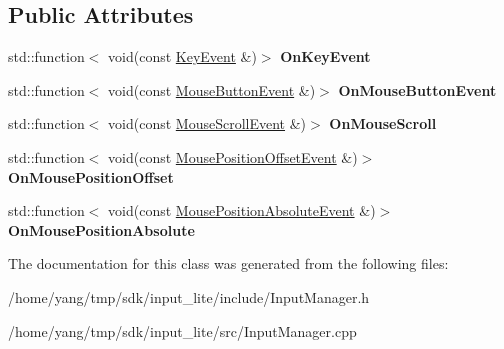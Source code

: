 \subsection*{Public Attributes}
\begin{DoxyCompactItemize}
\item 
std\+::function$<$ void(const \hyperlink{struct_s_l_1_1_input___lite_1_1_key_event}{Key\+Event} \&)$>$ {\bfseries On\+Key\+Event}\hypertarget{class_s_l_1_1_input___lite_1_1_input_manager_abb565d47b0c2be57d949d58ebfb25ad2}{}\label{class_s_l_1_1_input___lite_1_1_input_manager_abb565d47b0c2be57d949d58ebfb25ad2}

\item 
std\+::function$<$ void(const \hyperlink{struct_s_l_1_1_input___lite_1_1_mouse_button_event}{Mouse\+Button\+Event} \&)$>$ {\bfseries On\+Mouse\+Button\+Event}\hypertarget{class_s_l_1_1_input___lite_1_1_input_manager_a9acec2bd9dbb7becba6ffa7d7c4d4134}{}\label{class_s_l_1_1_input___lite_1_1_input_manager_a9acec2bd9dbb7becba6ffa7d7c4d4134}

\item 
std\+::function$<$ void(const \hyperlink{struct_s_l_1_1_input___lite_1_1_mouse_scroll_event}{Mouse\+Scroll\+Event} \&)$>$ {\bfseries On\+Mouse\+Scroll}\hypertarget{class_s_l_1_1_input___lite_1_1_input_manager_ab1094f8733da4d16a447db7de2fb6ae3}{}\label{class_s_l_1_1_input___lite_1_1_input_manager_ab1094f8733da4d16a447db7de2fb6ae3}

\item 
std\+::function$<$ void(const \hyperlink{struct_s_l_1_1_input___lite_1_1_mouse_position_offset_event}{Mouse\+Position\+Offset\+Event} \&)$>$ {\bfseries On\+Mouse\+Position\+Offset}\hypertarget{class_s_l_1_1_input___lite_1_1_input_manager_a00d65c62f147a2c91cf4ec6fa474c64c}{}\label{class_s_l_1_1_input___lite_1_1_input_manager_a00d65c62f147a2c91cf4ec6fa474c64c}

\item 
std\+::function$<$ void(const \hyperlink{struct_s_l_1_1_input___lite_1_1_mouse_position_absolute_event}{Mouse\+Position\+Absolute\+Event} \&)$>$ {\bfseries On\+Mouse\+Position\+Absolute}\hypertarget{class_s_l_1_1_input___lite_1_1_input_manager_a647c5aea6c79217ca87ec04d1c99d874}{}\label{class_s_l_1_1_input___lite_1_1_input_manager_a647c5aea6c79217ca87ec04d1c99d874}

\end{DoxyCompactItemize}


The documentation for this class was generated from the following files\+:\begin{DoxyCompactItemize}
\item 
/home/yang/tmp/sdk/input\+\_\+lite/include/Input\+Manager.\+h\item 
/home/yang/tmp/sdk/input\+\_\+lite/src/Input\+Manager.\+cpp\end{DoxyCompactItemize}
